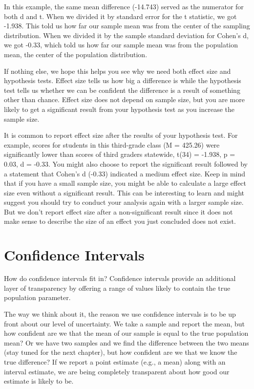 \documentclass[
  letterpaper,
  DIV=11,
  numbers=noendperiod]{scrreprt}
\begin{document}
In this example, the same mean difference (-14.743) served as the
numerator for both d and t. When we divided it by standard error for the
t statistic, we got -1.938. This told us how far our sample mean was
from the center of the sampling distribution. When we divided it by the
sample standard deviation for Cohen's d, we got -0.33, which told us how
far our sample mean was from the population mean, the center of the
population distribution.

If nothing else, we hope this helps you see why we need both effect size
and hypothesis tests. Effect size tells us how big a difference is while
the hypothesis test tells us whether we can be confident the difference
is a result of something other than chance. Effect size does not depend
on sample size, but you are more likely to get a significant result from
your hypothesis test as you increase the sample size.

It is common to report effect size after the results of your hypothesis
test. For example, scores for students in this third-grade class (M =
425.26) were significantly lower than scores of third graders statewide,
t(34) = -1.938, p = 0.03, d = -0.33. You might also choose to report the
significant result followed by a statement that Cohen's d (-0.33)
indicated a medium effect size. Keep in mind that if you have a small
sample size, you might be able to calculate a large effect size even
without a significant result. This can be interesting to learn and might
suggest you should try to conduct your analysis again with a larger
sample size. But we don't report effect size after a non-significant
result since it does not make sense to describe the size of an effect
you just concluded does not exist.

\section{Confidence Intervals}\label{confidence-intervals}

How do confidence intervals fit in? Confidence intervals provide an
additional layer of transparency by offering a range of values likely to
contain the true population parameter.

The way we think about it, the reason we use confidence intervals is to
be up front about our level of uncertainty. We take a sample and report
the mean, but how confident are we that the mean of our sample is equal
to the true population mean? Or we have two samples and we find the
difference between the two means (stay tuned for the next chapter), but
how confident are we that we know the true difference? If we report a
point estimate (e.g., a mean) along with an interval estimate, we are
being completely transparent about how good our estimate is likely to
be.
\end{document}
